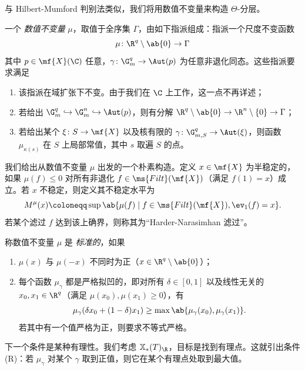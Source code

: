 与 Hilbert-Mumford 判别法类似，我们将用数值不变量来构造 \(\Theta\)-分层。
\begin{defn}
    一个 \textit{数值不变量} \(\mu\)，取值于全序集 \(\Gamma\)，由如下指派组成：指派一个尺度不变函数
    \[ \mu \colon \R^q \setminus \ab\{0\} \to \Gamma \]
    其中 \(p \in \mf{X}(\C)\) 任意，\(\gamma \colon \G_m^q \to \Aut(p)\) 为任意非退化同态。这些指派要求满足
    \begin{enumerate}
        \item 该指派在域扩张下不变。由于我们在 \(\C\) 上工作，这一点不再详述；
        \item 若给出 \(\G_m^q \hookrightarrow \G_m^n \hookrightarrow \Aut(p)\)，则有分解 \(\R^q \setminus \ab\{0\} \to \R^n \setminus \{0\} \to \Gamma\)；
        \item 若给出某个 \(\xi \colon S \to \mf{X}\) 以及核有限的 \(\gamma \colon \G_{m, S}^q \to \Aut(\xi)\)，则函数 \(\mu_{\kappa(s)}\) 在 \(S\) 上局部常值，其中 \(s\) 取遍 \(S\) 的点。
    \end{enumerate}
\end{defn}

我们给出从数值不变量 \(\mu\) 出发的一个朴素构造。定义 \(x \in \mf{X}\) 为半稳定的，如果 \(\mu(f) \leq 0\) 对所有非退化 \(f \in \ms{Filt}(\mf{X})\)（满足 \(f(1) = x\)）成立。若 \(x\) 不稳定，则定义其不稳定水平为
\[ M^{\mu}(x) \coloneqq \sup \ab\{ \mu(f) \mid f \in \ms{Filt}(\mf{X}), \ev_1(f) = x\}. \]
若某个滤过 \(f\) 达到该上确界，则称其为“Harder-Narasimhan 滤过”。

\begin{defn}
    称数值不变量 \(\mu\) 是 \textit{标准的}，如果
    \begin{enumerate}
        \item \(\mu(x)\) 与 \(\mu(-x)\) 不同时为正（\(x \in \R^q \setminus \ab\{0\}\)）；
        \item 每个函数 \(\mu_{\gamma}\) 都是严格拟凹的，即对所有 \(\delta \in [0,1]\) 以及线性无关的 \(x_0, x_1 \in \R^q\)（满足 \(\mu(x_0), \mu(x_1) \geq 0\)），有 
            \[\mu_{\gamma}(\delta x_0 + (1-\delta)x_1) \geq \max\ab\{\mu_{\gamma}(x_0), \mu_{\gamma}(x_1)\}.\] 若其中有一个值严格为正，则要求不等式严格。
    \end{enumerate}
\end{defn}

下一个条件是某种有理性。我们考虑 \(\mathbb{X}_*(T)_{\R}\)，目标是找到有理点。这就引出条件 (R)：若 \(\mu_{\gamma}\) 对某个 \(\gamma\) 取到正值，则它在某个有理点处取到最大值。

